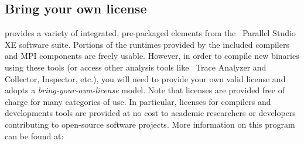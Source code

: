 \subsection{Bring your own license} \label{sec:byol}
\OHPC{} provides a variety of integrated, pre-packaged elements from the
\IntelR{}~Parallel Studio XE software suite. Portions of the runtimes provided
by the included compilers and MPI components are freely usable. However, in
order to compile new binaries using these tools (or access other analysis tools
like \IntelR{}~Trace Analyzer and Collector, \IntelR{} Inspector, etc.), you
will need to provide your own valid license and \OHPC{} adopts a {\em
 bring-your-own-license} model. Note that licenses are provided free of
charge for many categories of use. In particular, licenses for compilers and
developments tools are provided at no cost to academic researchers or
developers contributing to open-source software projects. More information on
this program can be found at: 

\begin{center}
\href{https://software.intel.com/en-us/qualify-for-free-software}
     {\color{blue}{https://software.intel.com/en-us/qualify-for-free-software}}
\end{center}

